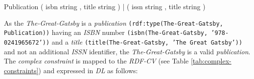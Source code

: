 \documentclass[a4paper,fontsize=11pt]{scrartcl}
\newcommand{\ms}[1]{\texttt{#1}}
\newenvironment{DL}{
  \vspace{0cm}
	\begin{center}
  \begin{tabular}{r l}

}{
  \end{tabular}
	\end{center}
}
\begin{document}


\begin{ex}
Publication { 
    ( isbn string , title string ) |
    ( issn string , title string ) }
\end{ex}



As the \emph{The-Great-Gatsby} is a \emph{publication} {\small\ms{(rdf:type(The-Great-Gatsby, Publication))}} having an \emph{ISBN} number {\small\ms{(isbn(The-Great-Gatsby, '978-0241965672'))}} and a \emph{title} {\small\ms{(title(The-Great-Gatsby, 'The Great Gatsby'))}} and not an additional \emph{ISSN} identifier, the \emph{The-Great-Gatsby} is a valid \emph{publication}.
The \emph{complex constraint} is mapped to the \emph{RDF-CV} (see Table \ref{tab:complex-constraints}) and expressed in \emph{DL} as follows:

\end{document}
